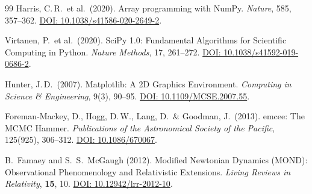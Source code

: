 \documentclass[aps,prd,twocolumn,superscriptaddress,nofootinbib,floatfix]{revtex4-2}
\begin{document}
\begin{thebibliography}{99}
Harris, C.\,R.\ et al.\ (2020).
Array programming with NumPy.
\textit{Nature}, 585, 357--362.
\href{https://doi.org/10.1038/s41586-020-2649-2}{DOI: 10.1038/s41586-020-2649-2}.

Virtanen, P.\ et al.\ (2020).
SciPy 1.0: Fundamental Algorithms for Scientific Computing in Python.
\textit{Nature Methods}, 17, 261--272.
\href{https://doi.org/10.1038/s41592-019-0686-2}{DOI: 10.1038/s41592-019-0686-2}.

Hunter, J.\,D.\ (2007).
Matplotlib: A 2D Graphics Environment.
\textit{Computing in Science \& Engineering}, 9(3), 90--95.
\href{https://doi.org/10.1109/MCSE.2007.55}{DOI: 10.1109/MCSE.2007.55}.

Foreman-Mackey, D., Hogg, D.\,W., Lang, D.\ \& Goodman, J.\ (2013).
emcee: The MCMC Hammer.
\textit{Publications of the Astronomical Society of the Pacific}, 125(925), 306--312.
\href{https://doi.org/10.1086/670067}{DOI: 10.1086/670067}.

B.~Famaey and S.~S.~McGaugh (2012).
Modified Newtonian Dynamics (MOND): Observational Phenomenology and Relativistic Extensions.
\textit{Living Reviews in Relativity}, \textbf{15}, 10.
\href{https://doi.org/10.12942/lrr-2012-10}{DOI: 10.12942/lrr-2012-10}.

\end{thebibliography}
\end{document}
